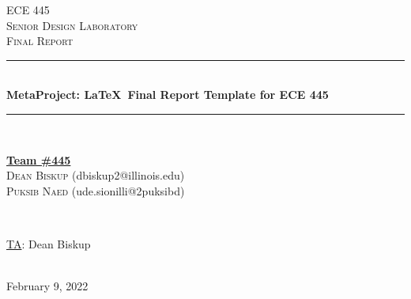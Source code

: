 \documentclass[12pt]{article}
\begin{document}
\begin{titlepage}
\newcommand{\HRule}{\rule{\linewidth}{0.1mm}} 
\center %
 
\textsc{\Large ECE 445}\\[0.5cm] %
\textsc{\large Senior Design Laboratory}\\[0.5cm] %
\textsc{\Large Final Report }\\[0.5cm] %

\HRule \\[0.5cm]
\huge \textbf{MetaProject: \LaTeX\ Final Report Template for ECE 445} %
\HRule \\[2cm]
 
\begin{minipage}{0.5\textwidth}
    \begin{center} \large
        \underline{\textbf{Team \#445}} \\ \medskip
        \textsc{Dean Biskup} (dbiskup2@illinois.edu) \\
        \textsc{Puksib Naed} (ude.sionilli@2puksibd) \\   %
    \end{center}
\end{minipage} \\[1.5cm]

\begin{minipage}{0.5\textwidth}
    \begin{center}
        \large
        \underline{TA}: Dean Biskup
    \end{center}
\end{minipage} \\[1cm]

{\large February 9, 2022} %

\vfill %

\end{titlepage}
\setcounter{page}{2}
\clearpage
\tableofcontents
\newpage
\end{document}
